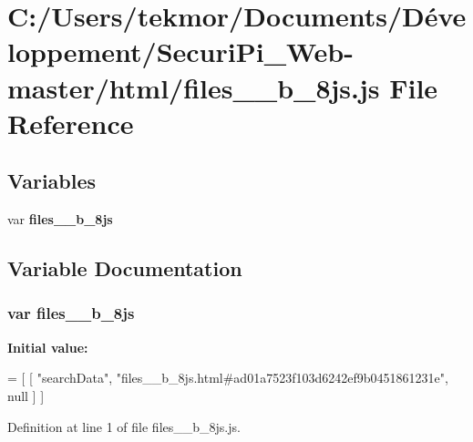 \section{C\+:/\+Users/tekmor/\+Documents/\+Développement/\+Securi\+Pi\+\_\+\+Web-\/master/html/files\+\_\+\+\_\+b\+\_\+8js.js File Reference}
\label{files____b__8js_8js}
\subsection*{Variables}
\begin{DoxyCompactItemize}
\item 
var {\bf files\+\_\+\+\_\+b\+\_\+8js}
\end{DoxyCompactItemize}


\subsection{Variable Documentation}
\subsubsection[{files\+\_\+\+\_\+b\+\_\+8js}]{\setlength{\rightskip}{0pt plus 5cm}var files\+\_\+\+\_\+b\+\_\+8js}\label{files____b__8js_8js_a7b8ef757b44b6bb623143306c839e82c}
{\bfseries Initial value\+:}
\begin{DoxyCode}
=
[
    [ \textcolor{stringliteral}{"searchData"}, \textcolor{stringliteral}{"files\_\_b\_8js.html#ad01a7523f103d6242ef9b0451861231e"}, null ]
]
\end{DoxyCode}


Definition at line 1 of file files\+\_\+\+\_\+b\+\_\+8js.\+js.


